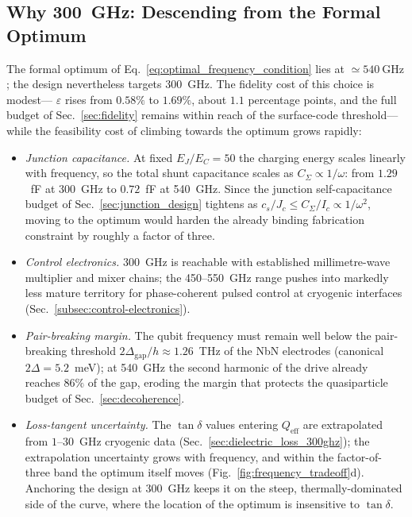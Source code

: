 \subsection{Why \SI{300}{\giga\hertz}: Descending from the Formal Optimum}
\label{subsec:why_300ghz}

The formal optimum of Eq.~\eqref{eq:optimal_frequency_condition} lies at
$\simeq \SI{540}{\giga\hertz}$; the design nevertheless targets
\SI{300}{\giga\hertz}. The fidelity cost of this choice is modest---
$\varepsilon$ rises from $0.58\%$ to $1.69\%$, about $1.1$ percentage
points, and the full budget of Sec.~\ref{sec:fidelity} remains within reach of
the surface-code threshold---while the feasibility cost of climbing towards
the optimum grows rapidly:

\begin{itemize}
\item \emph{Junction capacitance.} At fixed $E_J/E_C = 50$ the charging energy
scales linearly with frequency, so the total shunt capacitance scales as
$C_\Sigma \propto 1/\omega$: from $1.29$~fF at \SI{300}{\giga\hertz} to
$0.72$~fF at \SI{540}{\giga\hertz}. Since the junction self-capacitance budget
of Sec.~\ref{sec:junction_design} tightens as
$c_s/J_c \leq C_\Sigma/I_c \propto 1/\omega^{2}$, moving to the optimum would
harden the already binding fabrication constraint by roughly a factor of
three.
\item \emph{Control electronics.} \SI{300}{\giga\hertz} is reachable with
established millimetre-wave multiplier and mixer chains; the
\SI{450}{}--\SI{550}{\giga\hertz} range pushes into markedly less mature
territory for phase-coherent pulsed control at cryogenic interfaces
(Sec.~\ref{subsec:control-electronics}).
\item \emph{Pair-breaking margin.} The qubit frequency must remain well below
the pair-breaking threshold $2\Delta_{\text{gap}}/h \approx 1.26$~THz of the
NbN electrodes (canonical $2\Delta = 5.2$~meV); at \SI{540}{\giga\hertz} the
second harmonic of the drive already reaches $86\%$ of the gap, eroding the
margin that protects the quasiparticle budget of Sec.~\ref{sec:decoherence}.
\item \emph{Loss-tangent uncertainty.} The $\tan\delta$ values entering
$Q_{\text{eff}}$ are extrapolated from $1$--$30$~GHz cryogenic data
(Sec.~\ref{sec:dielectric_loss_300ghz}); the extrapolation uncertainty grows
with frequency, and within the factor-of-three band the optimum itself moves
(Fig.~\ref{fig:frequency_tradeoff}d). Anchoring the design at
\SI{300}{\giga\hertz} keeps it on the steep, thermally-dominated side of the
curve, where the location of the optimum is insensitive to $\tan\delta$.
\end{itemize}


